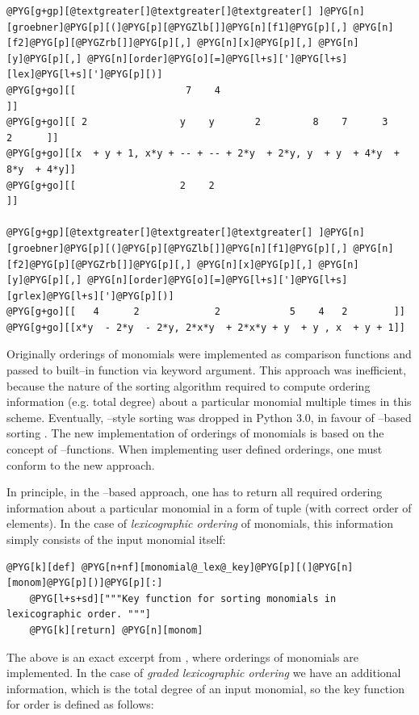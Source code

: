 \begin{Verbatim}[commandchars=@\[\]]
@PYG[g+gp][@textgreater[]@textgreater[]@textgreater[] ]@PYG[n][groebner]@PYG[p][(]@PYG[p][@PYGZlb[]]@PYG[n][f1]@PYG[p][,] @PYG[n][f2]@PYG[p][@PYGZrb[]]@PYG[p][,] @PYG[n][x]@PYG[p][,] @PYG[n][y]@PYG[p][,] @PYG[n][order]@PYG[o][=]@PYG[l+s][']@PYG[l+s][lex]@PYG[l+s][']@PYG[p][)]
@PYG[g+go][[                   7    4                                          ]]
@PYG[g+go][[ 2                y    y       2         8    7      3      2      ]]
@PYG[g+go][[x  + y + 1, x*y + -- + -- + 2*y  + 2*y, y  + y  + 4*y  + 8*y  + 4*y]]
@PYG[g+go][[                  2    2                                           ]]

@PYG[g+gp][@textgreater[]@textgreater[]@textgreater[] ]@PYG[n][groebner]@PYG[p][(]@PYG[p][@PYGZlb[]]@PYG[n][f1]@PYG[p][,] @PYG[n][f2]@PYG[p][@PYGZrb[]]@PYG[p][,] @PYG[n][x]@PYG[p][,] @PYG[n][y]@PYG[p][,] @PYG[n][order]@PYG[o][=]@PYG[l+s][']@PYG[l+s][grlex]@PYG[l+s][']@PYG[p][)]
@PYG[g+go][[   4      2             2            5    4   2        ]]
@PYG[g+go][[x*y  - 2*y  - 2*y, 2*x*y  + 2*x*y + y  + y , x  + y + 1]]
\end{Verbatim}
\noindent
Originally orderings of monomials were implemented as comparison functions and passed to \href{http://docs.python.org/library/functions.html\#sorted}{}
built--in function via  keyword argument. This approach was inefficient, because the nature of
the sorting algorithm required to compute ordering information (e.g. total degree) about a particular
monomial multiple times in this scheme. Eventually, --style sorting was dropped in Python 3.0,
in favour of --based sorting \cite{PythonIssue1771}. The new implementation of orderings of monomials
is based on the concept of --functions. When implementing user defined orderings, one must conform
to the new approach.

In principle, in the --based approach, one has to return all required ordering information about
a particular monomial in a form of tuple (with correct order of elements). In the case of \emph{lexicographic
ordering} of monomials, this information simply consists of the input monomial itself:

\begin{Verbatim}[commandchars=@\[\]]
@PYG[k][def] @PYG[n+nf][monomial@_lex@_key]@PYG[p][(]@PYG[n][monom]@PYG[p][)]@PYG[p][:]
    @PYG[l+s+sd]["""Key function for sorting monomials in lexicographic order. """]
    @PYG[k][return] @PYG[n][monom]
\end{Verbatim}
\noindent
The above is an exact excerpt from , where orderings of monomials are
implemented. In the case of \emph{graded lexicographic ordering} we have an additional information, which is
the total degree of an input monomial, so the key function for  order is defined as follows:

